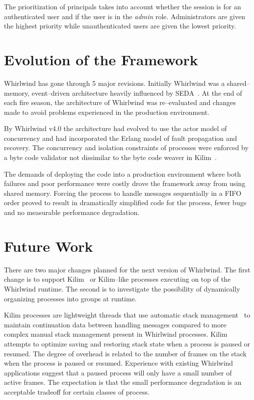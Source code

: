 \documentclass[conference,a4paper,final]{IEEEtran}
\begin{document}
The prioritization of principals takes into account whether the session is for an authenticated user and if the user is in the \emph{admin} role. Administrators are given the highest priority while unauthenticated users are given the lowest priority.

\section{Evolution of the Framework}

Whirlwind has gone through 5 major revisions. Initially Whirlwind was a shared--memory, event--driven architecture heavily influenced by SEDA~\cite{welsh03Adaptive}. At the end of each fire season, the architecture of Whirlwind was re--evaluated and changes made to avoid problems experienced in the production environment. 

By Whirlwind v4.0 the architecture had evolved to use the actor model of concurrency and had incorporated the Erlang model of fault propagation and recovery. The concurrency and isolation constraints of processes were enforced by a byte code validator not dissimilar to the byte code weaver in Kilim~\cite{Srinivasan:08:Kilim}.

The demands of deploying the code into a production environment where both failures and poor performance were costly drove the framework away from using shared memory. Forcing the process to handle messages sequentially in a FIFO order proved to result in dramatically simplified code for the process, fewer bugs and no measurable performance degradation.

\section{Future Work}

There are two major changes planned for the next version of Whirlwind. The first change is to support Kilim~\cite{Srinivasan:08:Kilim} or Kilim--like processes executing on top of the Whirlwind runtime. The second is to investigate the possibility of dynamically organizing processes into groups at runtime. 

Kilim processes are lightweight threads that use automatic stack management~\cite{Adya02Cooperative} to maintain continuation data between handling messages compared to more complex manual stack management present in Whirlwind processes. Kilim attempts to optimize saving and restoring stack state when a process is paused or resumed. The degree of overhead is related to the number of frames on the stack when the process is paused or resumed. Experience with existing Whirlwind applications suggest that a paused process will only have a small number of active frames. The expectation is that the small performance degradation is an acceptable tradeoff for certain classes of process.
\end{document}
